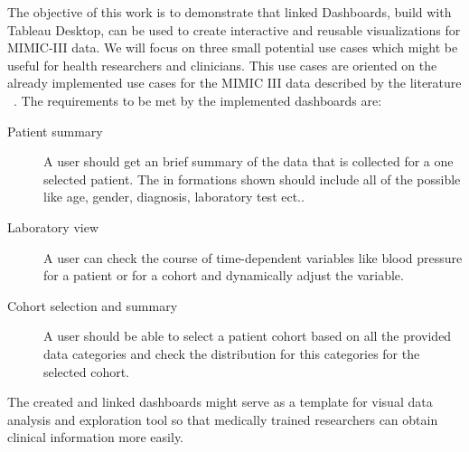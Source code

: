 The objective of this work is to demonstrate that linked Dashboards, build with Tableau Desktop, can be used to create interactive and reusable visualizations for MIMIC-III data. We will focus on three small potential use cases which might be useful for health researchers and clinicians. This use cases are oriented on the already implemented use cases for the MIMIC III data described by the literature ~\cite{Lee.2016, Festag.2019}.
The requirements to be met by the implemented dashboards are:
\begin{description}
\item[Patient summary] A user should get an brief summary of the data that is collected for a one selected patient. The in formations shown should include all of the possible   like age, gender, diagnosis, laboratory test ect..
\item[Laboratory view] A user can check the course of time-dependent variables like blood pressure for a patient or for a cohort and dynamically adjust the variable.
\item[Cohort selection and summary] A user should be able to select a patient cohort based on all the provided data categories and check the distribution for this categories for the selected cohort.
\end{description}

The created and linked dashboards might serve as a template for visual data analysis and exploration tool so that medically trained researchers can obtain clinical information more easily.